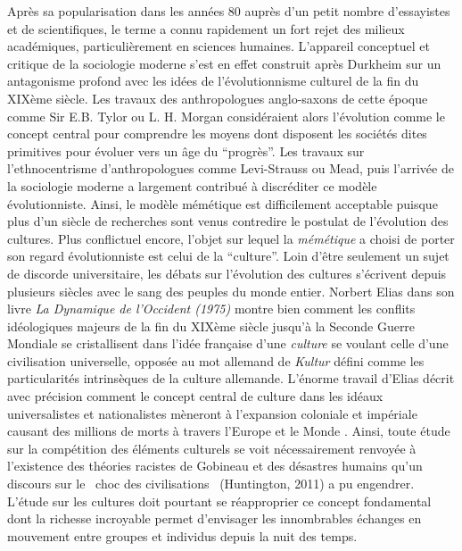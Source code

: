 Apr\`es sa popularisation dans les ann\'ees 80 aupr\`es d{\textquoteright}un petit nombre d{\textquoteright}essayistes et de scientifiques, le terme a connu rapidement un fort rejet des milieux acad\'emiques, particuli\`erement en sciences humaines. L{\textquoteright}appareil conceptuel et critique de la sociologie moderne s{\textquoteright}est en effet construit apr\`es Durkheim sur un antagonisme profond avec les id\'ees de l{\textquoteright}\'evolutionnisme culturel de la fin du XIX\`eme si\`ecle. Les travaux des anthropologues anglo-saxons de cette \'epoque comme Sir E.B. Tylor ou L. H. Morgan consid\'eraient alors l{\textquoteright}\'evolution comme le concept central pour comprendre les moyens dont disposent les soci\'et\'es dites primitives pour \'evoluer vers un \^age du {\textquotedblleft}progr\`es{\textquotedblright}. Les travaux sur l{\textquoteright}ethnocentrisme d{\textquoteright}anthropologues comme Levi-Strauss ou Mead, puis l{\textquoteright}arriv\'ee de la sociologie moderne a largement contribu\'e \`a discr\'editer ce mod\`ele \'evolutionniste. Ainsi, le mod\`ele m\'em\'etique est difficilement acceptable puisque plus d{\textquoteright}un si\`ecle de recherches sont venus contredire le postulat de l{\textquoteright}\'evolution des cultures. Plus conflictuel encore, l{\textquoteright}objet sur lequel la \textit{m\'em\'etique} a choisi de porter son regard \'evolutionniste est celui de la {\textquotedblleft}culture{\textquotedblright}. Loin d{\textquoteright}\^etre seulement un sujet de discorde universitaire, les d\'ebats sur l{\textquoteright}\'evolution des cultures s{\textquoteright}\'ecrivent depuis plusieurs si\`ecles avec le sang des peuples du monde entier. Norbert Elias dans son livre \textit{La Dynamique de l{\textquoteright}Occident (1975) }montre bien comment les conflits id\'eologiques majeurs de la fin du XIX\`eme si\`ecle jusqu{\textquoteright}\`a la Seconde Guerre Mondiale se cristallisent dans l{\textquoteright}id\'ee fran\c{c}aise d{\textquoteright}une \textit{culture} se voulant celle d{\textquoteright}une civilisation universelle, oppos\'ee au mot allemand de \textit{Kultur} d\'efini comme les particularit\'es intrins\`eques de la culture allemande. L{\textquoteright}\'enorme travail d{\textquoteright}Elias d\'ecrit avec pr\'ecision comment le concept central de culture dans les id\'eaux universalistes et nationalistes m\`eneront \`a l{\textquoteright}expansion coloniale et imp\'eriale causant des millions de morts \`a travers l{\textquoteright}Europe et le Monde \cite{Elias1975}. Ainsi, toute \'etude sur la comp\'etition des \'el\'ements culturels se voit n\'ecessairement renvoy\'ee \`a l{\textquoteright}existence des th\'eories racistes de Gobineau et des d\'esastres humains qu{\textquoteright}un discours sur le {\guillemotleft}~choc des civilisations~{\guillemotright} (Huntington, 2011) a pu engendrer. L{\textquoteright}\'etude sur les cultures doit pourtant se r\'eapproprier ce concept fondamental dont la richesse incroyable permet d{\textquoteright}envisager les innombrables \'echanges en mouvement entre groupes et individus depuis la nuit des temps. 

